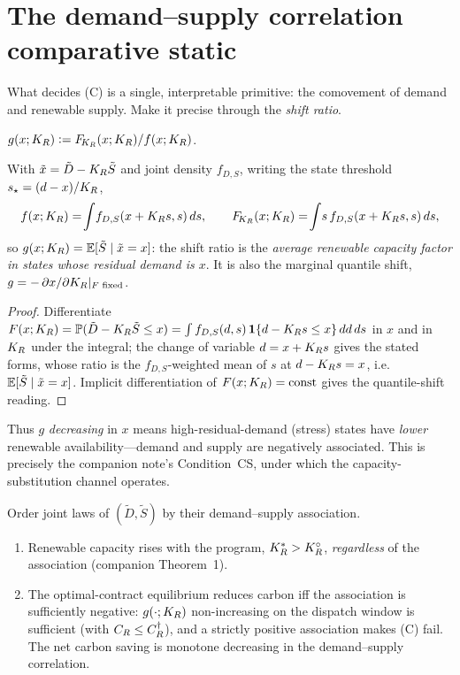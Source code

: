 \section{The demand--supply correlation comparative static}\label{r1exc-sec:corr}

What decides (C) is a single, interpretable primitive: the comovement of demand
and renewable supply. Make it precise through the \emph{shift ratio}.

\begin{definition}[Shift ratio = conditional renewable factor]\label{r1exc-def:g}
$g(x;K_R)\vcentcolon= F_{\!K_R}(x;K_R)/f(x;K_R)$.
\end{definition}

\begin{lemma}[Identity]\label{r1exc-lem:g}
With $\tilde x=\tilde D-K_R\tilde S$ and joint density $f_{D,S}$, writing the
state threshold $s_\star=(d-x)/K_R$,
\[
  f(x;K_R)=\!\int\! f_{D,S}(x+K_R s,s)\,ds,
  \qquad
  F_{\!K_R}(x;K_R)=\!\int\! s\,f_{D,S}(x+K_R s,s)\,ds,
\]
so $g(x;K_R)=\mathbb{E}[\tilde S\mid \tilde x = x]$: the shift ratio is the
\emph{average renewable capacity factor in states whose residual demand is $x$}.
It is also the marginal quantile shift, $g=-\,\partial x/\partial K_R|_{F\text{ fixed}}$.
\end{lemma}

\begin{proof}
Differentiate $F(x;K_R)=\mathbb{P}(\tilde D-K_R\tilde S\le x)
=\int f_{D,S}(d,s)\,\mathbf 1\{d-K_R s\le x\}\,dd\,ds$ in $x$ and in $K_R$ under
the integral; the change of variable $d=x+K_R s$ gives the stated forms, whose
ratio is the $f_{D,S}$-weighted mean of $s$ at $d-K_R s=x$, i.e.\
$\mathbb{E}[\tilde S\mid\tilde x=x]$. Implicit differentiation of $F(x;K_R)=\text{const}$
gives the quantile-shift reading.
\end{proof}

Thus $g$ \emph{decreasing} in $x$ means high-residual-demand (stress) states have
\emph{lower} renewable availability---demand and supply are negatively
associated. This is precisely the companion note's Condition~CS, under which the
capacity-substitution channel operates.

\begin{theorem}\label{r1exc-thm:corr}
Order joint laws of $(\tilde D,\tilde S)$ by their demand--supply association.
\begin{enumerate}[label=(\roman*),leftmargin=2.2em]
  \item Renewable capacity rises with the program, $K_R^{*}>K_R^{\circ}$, \emph{regardless}
        of the association (companion Theorem~1).
  \item The optimal-contract equilibrium reduces carbon iff the association is
        sufficiently negative: $g(\cdot;K_R)$ non-increasing on the dispatch
        window is sufficient (with $C_R\le C_R^{\dagger}$), and a strictly positive
        association makes (C) fail. The net carbon saving is monotone decreasing
        in the demand--supply correlation.
\end{enumerate}
\end{theorem}

